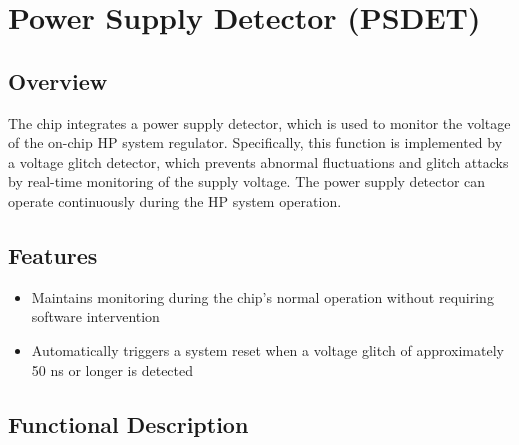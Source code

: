 \documentclass[main\_\_EN.tex]{subfiles}
\begin{document}
\setenglishformatting

\ifglobal
\else
    \clearpage
    \listoftodos
    \listofdonetodos
    \tableofcontents
\fi



\hypertarget{psdet}{}
\chapter{Power Supply Detector (PSDET)}
\label{mod:psdet}


\section{Overview}

The \chipname{} chip integrates a power supply detector, which is used to monitor the voltage of the on-chip HP system regulator. Specifically, this function is implemented by a voltage glitch detector, which prevents abnormal fluctuations and glitch attacks by real-time monitoring of the supply voltage. The power supply detector can operate continuously during the HP system operation.


\section{Features}
\label{sec:psdet-features}
\begin{itemize}
    \item Maintains monitoring during the chip's normal operation without requiring software intervention
    \item Automatically triggers a system reset when a voltage glitch of approximately 50 ns or longer is detected
\end{itemize}



\section{Functional Description}
\end{document}

